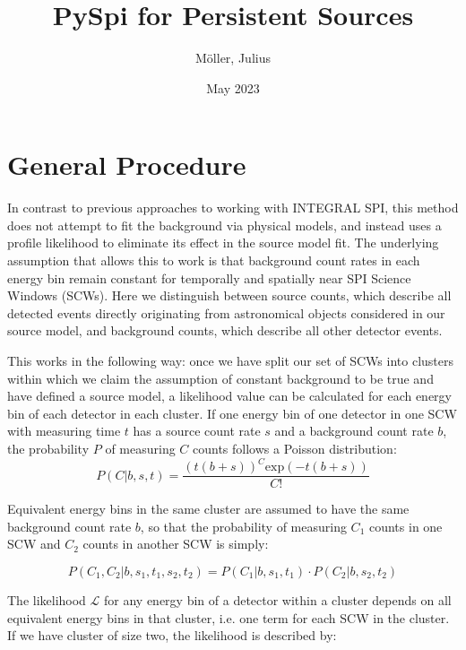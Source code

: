 \documentclass{article}
\title{PySpi for Persistent Sources}
\author{Möller, Julius}
\date{May 2023}
\begin{document}
\maketitle


\tableofcontents

\pagebreak


\section{General Procedure}
In contrast to previous approaches to working with INTEGRAL SPI, this method does not attempt to fit the background via physical models, and instead uses a profile likelihood to eliminate its effect in the source model fit. The underlying assumption that allows this to work is that background count rates in each energy bin remain constant for temporally and spatially near SPI Science Windows (SCWs). Here we distinguish between source counts, which describe all detected events directly originating from astronomical objects considered in our source model, and background counts, which describe all other detector events.

This works in the following way: once we have split our set of SCWs into clusters within which we claim the assumption of constant background to be true and have defined a source model, a likelihood value can be calculated for each energy bin of each detector in each cluster. If one energy bin of one detector in one SCW with measuring time $t$ has a source count rate $s$ and a background count rate $b$, the probability $P$ of measuring $C$ counts follows a Poisson distribution:
\begin{equation}
    P(C \vert b, s, t) = \frac{\left( t \left( b + s \right) \right) ^C \text{exp}\left( -t \left( b+s\right)\right)}{C!}
\end{equation}

Equivalent energy bins in the same cluster are assumed to have the same background count rate $b$, so that the probability of measuring $C_1$ counts in one SCW and $C_2$ counts in another SCW is simply:

\begin{equation}
    P(C_1, C_2 \vert b, s_1, t_1, s_2, t_2) = P(C_1 \vert b, s_1, t_1) \cdot P(C_2 \vert b, s_2, t_2)
\end{equation}

The likelihood $\mathcal{L}$ for any energy bin of a detector within a cluster depends on all equivalent energy bins in that cluster, i.e. one term for each SCW in the cluster. If we have cluster of size two, the likelihood is described by:
\end{document}
